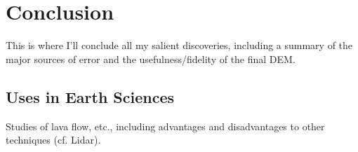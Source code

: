 \section{Conclusion}

This is where I'll conclude all my salient discoveries, including a summary of
the major sources of error and the usefulness/fidelity of the final DEM.

\subsection{Uses in Earth Sciences}

Studies of lava flow, etc., including advantages and disadvantages to other
techniques (cf. Lidar).
